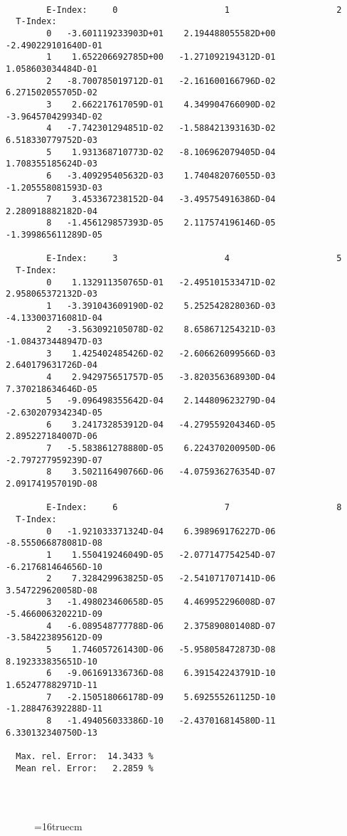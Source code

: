 \documentclass[12pt,dvipdfmx]{article}
\begin{document}
\begin{small}\begin{verbatim}

        E-Index:     0                     1                     2
  T-Index:
        0   -3.601119233903D+01    2.194488055582D+00   -2.490229101640D-01
        1    1.652206692785D+00   -1.271092194312D-01    1.058603034484D-01
        2   -8.700785019712D-01   -2.161600166796D-02    6.271502055705D-02
        3    2.662217617059D-01    4.349904766090D-02   -3.964570429934D-02
        4   -7.742301294851D-02   -1.588421393163D-02    6.518330779752D-03
        5    1.931368710773D-02   -8.106962079405D-04    1.708355185624D-03
        6   -3.409295405632D-03    1.740482076055D-03   -1.205558081593D-03
        7    3.453367238152D-04   -3.495754916386D-04    2.280918882182D-04
        8   -1.456129857393D-05    2.117574196146D-05   -1.399865611289D-05

        E-Index:     3                     4                     5
  T-Index:
        0    1.132911350765D-01   -2.495101533471D-02    2.958065372132D-03
        1   -3.391043609190D-02    5.252542828036D-03   -4.133003716081D-04
        2   -3.563092105078D-02    8.658671254321D-03   -1.084373448947D-03
        3    1.425402485426D-02   -2.606626099566D-03    2.640179631726D-04
        4    2.942975651757D-05   -3.820356368930D-04    7.370218634646D-05
        5   -9.096498355642D-04    2.144809623279D-04   -2.630207934234D-05
        6    3.241732853912D-04   -4.279559204346D-05    2.895227184007D-06
        7   -5.583861278880D-05    6.224370200950D-06   -2.797277959239D-07
        8    3.502116490766D-06   -4.075936276354D-07    2.091741957019D-08

        E-Index:     6                     7                     8
  T-Index:
        0   -1.921033371324D-04    6.398969176227D-06   -8.555066878081D-08
        1    1.550419246049D-05   -2.077147754254D-07   -6.217681464656D-10
        2    7.328429963825D-05   -2.541071707141D-06    3.547229620058D-08
        3   -1.498023460658D-05    4.469952296008D-07   -5.466006320221D-09
        4   -6.089548777788D-06    2.375890801408D-07   -3.584223895612D-09
        5    1.746057261430D-06   -5.958058472873D-08    8.192333835651D-10
        6   -9.061691336736D-08    6.391542243791D-10    1.652477882971D-11
        7   -2.150518066178D-09    5.692555261125D-10   -1.288476392288D-11
        8   -1.494056033386D-10   -2.437016814580D-11    6.330132340750D-13

  Max. rel. Error:  14.3433 %
  Mean rel. Error:   2.2859 %




\end{verbatim}\end{small}
\begin{figure} \label{2.2.15a}
\epsfxsize=16truecm
\end{figure}
\newpage
\end{document}

